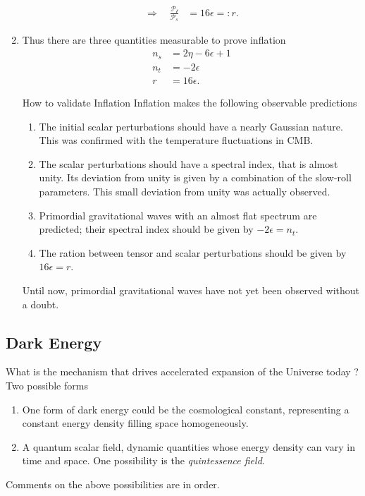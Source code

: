 \begin{enumerate}
\begin{align}
	\Rightarrow \quad \frac{\mathcal{P_t}}{\mathcal{P}_s} &=16 \epsilon =: r.
\end{align}
\item Thus there are three quantities measurable to prove inflation
\begin{align}
	n_s &= 2 \eta - 6 \epsilon +1 \\
	n_t &= -2 \epsilon\\
	r&= 16 \epsilon.
\end{align}
\begin{mybox}{How to validate Inflation}
	Inflation makes the following observable predictions
	\begin{enumerate}
		\item The initial scalar perturbations should have a nearly Gaussian nature. This was confirmed with the temperature fluctuations in CMB.
		\item The scalar perturbations should have a spectral index, that is almost unity. Its deviation from unity is given by a combination of the slow-roll parameters. This small deviation from unity was actually observed.
		\item Primordial gravitational waves with an almost flat spectrum are predicted; their spectral index should be given by $-2 \epsilon = n_t$.
		\item The ration between tensor and scalar perturbations should be given by $16\epsilon =r$.
	\end{enumerate}
	Until now, primordial gravitational waves have not yet been observed without a doubt.
\end{mybox}

\end{enumerate}


















\subsection{Dark Energy}
What is the mechanism that drives accelerated expansion of the Universe today ?\\
Two possible forms
\begin{enumerate}
	\item One form of dark energy could be the cosmological constant, representing a constant energy density filling space homogeneously.
	\item A quantum scalar field, dynamic quantities whose energy density can vary in time and space. One possibility is the \emph{quintessence field}.
\end{enumerate}
Comments on the above possibilities are in order.
